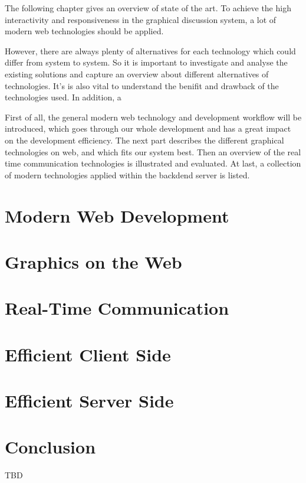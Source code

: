The following chapter gives an overview of state of the art. To achieve the high interactivity and responsiveness in the graphical discussion system, a lot of modern web technologies should be applied.

However, there are always plenty of alternatives for each technology which could differ from system to system. So it is important to investigate and analyse the existing solutions and capture an overview about different alternatives of technologies. It's is also vital to understand the benifit and drawback of the technologies used. In addition, a

First of all, the general modern web technology and development workflow will be introduced, which goes through our whole development and has a great impact on the development efficiency. The next part describes the different graphical technologies on web, and which fits our system best. Then an overview of the real time communication technologies is illustrated and evaluated. At last, a collection of modern technologies applied within the backdend server is listed.

\section{Modern Web Development}

\section{Graphics on the Web}

\section{Real-Time Communication}

\section{Efficient Client Side}

\section{Efficient Server Side}



\section{Conclusion}

TBD